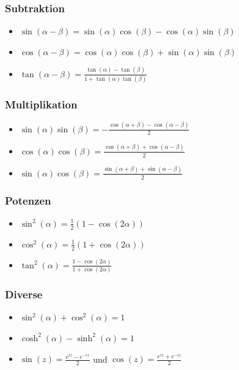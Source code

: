 \documentclass[8pt]{article}
\begin{document}
\begin{multicols*}{3}
\subsubsection{Subtraktion}
\begin{itemize}
 \item $\sin(\alpha - \beta) = \sin(\alpha) \cos(\beta) - \cos(\alpha)\sin(\beta)$
 \item $\cos(\alpha - \beta) = \cos(\alpha) \cos(\beta) + \sin(\alpha)\sin(\beta)$
 \item $\tan(\alpha - \beta) = \frac{\tan(\alpha) - \tan(\beta)}{1+\tan(\alpha) \tan(\beta)}$
\end{itemize}

\subsubsection{Multiplikation}
\begin{itemize}
 \item $\sin(\alpha) \sin(\beta) = -\frac{\cos(\alpha + \beta) - \cos(\alpha - \beta)}{2}$
 \item $\cos(\alpha) \cos(\beta) =  \frac{\cos(\alpha + \beta) + \cos(\alpha - \beta)}{2}$
 \item $\sin(\alpha) \cos(\beta) =  \frac{\sin(\alpha + \beta) + \sin(\alpha - \beta)}{2}$
\end{itemize}

\subsubsection{Potenzen}
\begin{itemize}
 \item $\sin^2(\alpha) = \frac{1}{2}(1-\cos(2\alpha))$
 \item $\cos^2(\alpha) = \frac{1}{2}(1+\cos(2\alpha))$
 \item $\tan^2(\alpha) = \frac{1-\cos(2\alpha)}{1+\cos(2\alpha)}$
\end{itemize}

\subsubsection{Diverse}

\begin{itemize}
 \item $\sin^2(\alpha) + \cos^2(\alpha) = 1$
 \item $\cosh^2(\alpha) - \sinh^2(\alpha) = 1$
 \item $\sin(z) = \frac{e^{iz} - e^{-iz}}{2}$ und $\cos(z) = \frac{e^{iz} + e^{-iz}}{2}$
\end{itemize}



\end{multicols*}
\end{document}

